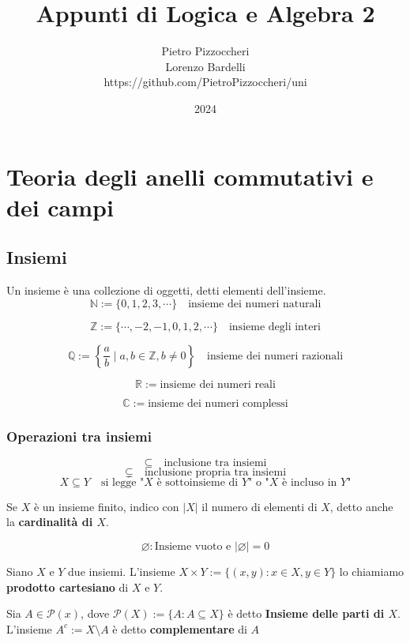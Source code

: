 \documentclass[a4paper,12pt]{article}
\title{Appunti di Logica e Algebra 2}
\author{Pietro Pizzoccheri \\ Lorenzo Bardelli \\ https://github.com/PietroPizzoccheri/uni}
\date{2024}
\theoremstyle{def}
\theoremstyle{prop}
\theoremstyle{esempio}
\theoremstyle{dimostrazione}
\theoremstyle{teo}
\theoremstyle{osservazione}
\begin{document}
\maketitle

\tableofcontents

\newpage
\section{Teoria degli anelli commutativi e dei campi}


\subsection{Insiemi}

Un insieme è una collezione di oggetti, detti elementi dell'insieme.
\[
	\mathbb{N} := \{ 0,1,2,3,\cdots\} \quad \text{insieme dei numeri naturali}
\]

\[
	\mathbb{Z} := \{ \cdots,-2,-1,0,1,2,\cdots\} \quad \text{insieme degli interi}
\]

\[
	\mathbb{Q} := \left\{ \frac{a}{b} \mid a,b \in \mathbb{Z}, b \neq 0
	\right\} \quad \text{insieme dei numeri razionali}
\]

\[
	\mathbb{R} := \text{insieme dei numeri reali}
\]

\[
	\mathbb{C} := \text{insieme dei numeri complessi}
\]

\subsubsection{Operazioni tra insiemi}

\[
	\subseteq \quad \text{inclusione tra insiemi}
\]
\[
	\subsetneq \quad \text{inclusione propria tra insiemi}
\]
\[
	X \subseteq Y \quad \text{si legge "} X \text{ è sottoinsieme di }Y \text{"
		o "} X \text{ è incluso in } Y\text{"}
\]

Se \(X\) è un insieme finito, indico con \(|X|\) il numero di elementi di
\(X\), detto anche la \textbf{cardinalità di \(X\)}.

\[\varnothing : \text{Insieme vuoto e } |\varnothing| = 0\]

Siano \(X\) e \(Y\) due insiemi. L'insieme \begin{math}
	X \times Y := \{ (x,y) : x \in X , y \in Y \}
\end{math} lo chiamiamo \textbf{prodotto cartesiano} di \(X\) e \(Y\).
\vspace{\baselineskip}

Sia \begin{math}
	A \in \mathcal{P} (x)
\end{math}, dove \begin{math}
	\mathcal{P} (X) := \{ A : A \subseteq X \}
\end{math} è detto \textbf{Insieme delle parti di \(X\)}. L'insieme \begin{math}
	A^c := X \setminus A
\end{math} è detto \textbf{complementare} di \(A\)
\end{document}
